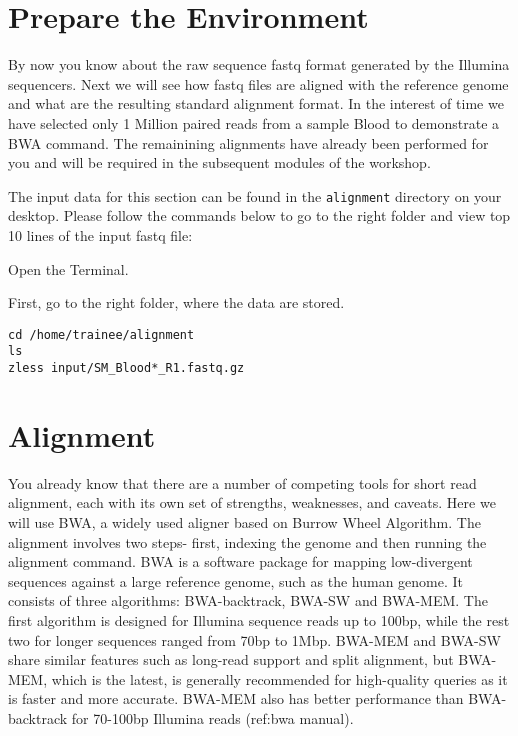\section{Prepare the Environment}

\begin{information}
By now you know about the raw sequence fastq format generated by the Illumina sequencers. Next we will see how fastq files are aligned with the reference genome and what are the resulting standard alignment format. 
In the interest of time we have selected only 1 Million paired reads from a sample Blood to demonstrate a BWA command. The remainining alignments have already been performed for you and will be required in the subsequent modules of the workshop.

The input data for this section can be found in the \texttt{alignment}
directory on your desktop. Please follow the commands below to go to the right folder and view top 10 lines of the input fastq file:
\end{information}

\begin{steps}
Open the Terminal.

First, go to the right folder, where the data are stored.
\begin{lstlisting}
cd /home/trainee/alignment
ls
zless input/SM_Blood*_R1.fastq.gz
\end{lstlisting}

\end{steps}

\section{Alignment}

\begin{information}
You already know that there are a number of competing tools for short read alignment, each with its own set of strengths, weaknesses, and caveats. Here we will use BWA, a widely used aligner based on Burrow Wheel Algorithm.  The alignment involves two steps- first, indexing the genome and then running the alignment command.  
BWA is a software package for mapping low-divergent sequences against a large reference genome, such as the human genome. It consists of three algorithms: BWA-backtrack, BWA-SW and BWA-MEM. The first algorithm is designed for Illumina sequence reads up to 100bp, while the rest two for longer sequences ranged from 70bp to 1Mbp. BWA-MEM and BWA-SW share similar features such as long-read support and split alignment, but BWA-MEM, which is the latest, is generally recommended for high-quality queries as it is faster and more accurate. BWA-MEM also has better performance than BWA-backtrack for 70-100bp Illumina reads (ref:bwa manual).
\end{information}

